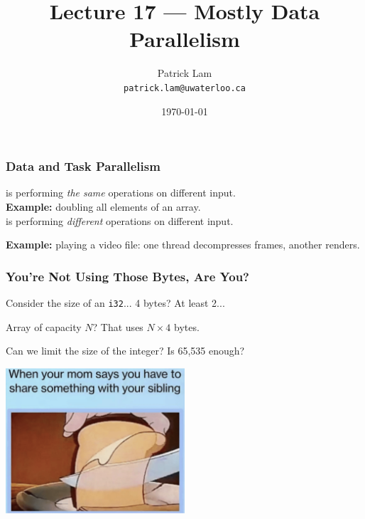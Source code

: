 

\title{Lecture 17 --- Mostly Data Parallelism }

\author{Patrick Lam \\ \small \texttt{patrick.lam@uwaterloo.ca}}
\date{\today}




\begin{frame}
  \titlepage

 \end{frame}


\begin{frame}
  \frametitle{Data and Task Parallelism}

  
      is performing \emph{the same} operations on
      different input.\\

     {\bf Example:} doubling all elements of an array.\\[1em]

      is performing \emph{different} operations
      on different input.

    {\bf Example:} playing a video file: one thread decompresses
      frames, another renders.

  
\end{frame}


\begin{frame}
\frametitle{You're Not Using Those Bytes, Are You?}

Consider the size of an \texttt{i32}... 4 bytes? At least 2...

Array of capacity $N$? That uses $N \times 4$ bytes.

Can we limit the size of the integer? Is 65,535 enough?

\begin{center}
	\includegraphics[width=0.5\textwidth]{images/havetoshare.png}
\end{center}

\end{frame}


